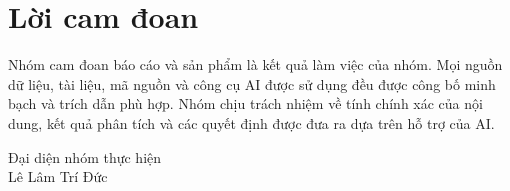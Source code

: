 \chapter*{Lời cam đoan}

Nhóm cam đoan báo cáo và sản phẩm là kết quả làm việc của nhóm. Mọi nguồn dữ liệu,
tài liệu, mã nguồn và công cụ AI được sử dụng đều được công bố minh bạch và trích
dẫn phù hợp. Nhóm chịu trách nhiệm về tính chính xác của nội dung, kết quả phân tích
và các quyết định được đưa ra dựa trên hỗ trợ của AI.

\vspace{1.5cm}
\begin{flushright}
Đại diện nhóm thực hiện\\[1.5cm]
Lê Lâm Trí Đức
\end{flushright}


